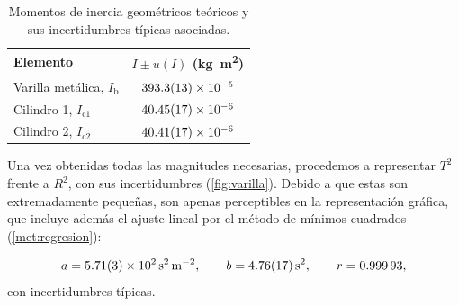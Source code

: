 \documentclass[a4paper,11pt]{amsart}
\numberwithin{equation}{section}
\newcommand{\Ib}{I_{\mathrm{b}}}              %
\theoremstyle{cienplano}
\theoremstyle{ciendef}
\theoremstyle{cienobs}
\begin{document}
\begin{table}[ht]
\centering
\caption{Momentos de inercia geométricos teóricos y sus incertidumbres
típicas asociadas.}
\label{tab:Momentosdeinercia}
\renewcommand{\arraystretch}{1.2}
\begin{tabular}{@{}l c@{}}
\toprule
Elemento & $I\pm u(I)$ (\si{\kilogram\meter\squared}) \\
\midrule
Varilla metálica, $\Ib$   & $\num{393,3 \pm 1,3 e-5}$ \\
Cilindro 1, $I_{\mathrm{c}1}$ & $\num{40,45 \pm 0,17 e-6}$ \\
Cilindro 2, $I_{\mathrm{c}2}$ & $\num{40,41 \pm 0,17 e-6}$ \\
\bottomrule
\end{tabular}
\end{table}

Una vez obtenidas todas las magnitudes necesarias, procedemos a representar
$T^{2}$ frente a $R^{2}$, con sus incertidumbres (\cref{fig:varilla}).
Debido a que estas son extremadamente pequeñas, son apenas perceptibles en
la representación gráfica, que incluye además el ajuste lineal por el método
de mínimos cuadrados (\cref{met:regresion}):
\begin{destacado}[Ajuste lineal $T^{2}=a\,R^{2}+b$]
\vspace{-6pt}
\begin{equation*}
  a=\SI{5,71 \pm 0,03 e2}{\second\squared\per\meter\squared},
  \qquad
  b=\SI{4,76 \pm 0,17}{\second\squared},
  \qquad
  r=\num{0,99993},
\end{equation*}
{\small con incertidumbres típicas.}
\end{destacado}
\end{document}
